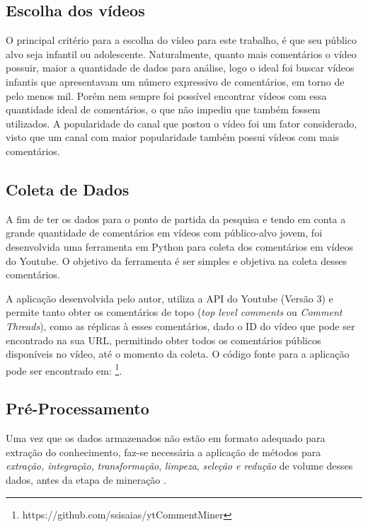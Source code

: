 \subsection{Escolha dos vídeos}
O principal critério para a escolha do vídeo para este trabalho, é que seu público alvo seja infantil ou adolescente. Naturalmente, quanto mais comentários o vídeo possuir, maior a quantidade de dados para análise, logo o ideal foi buscar vídeos infantis que apresentavam um número expressivo de comentários, em torno de pelo menos mil. Porém nem sempre foi possível encontrar vídeos com essa quantidade ideal de comentários, o que não impediu que também fossem utilizados. A popularidade do canal que postou o vídeo foi um fator  considerado, visto que um canal com maior popularidade também  possui vídeos com mais comentários.


\subsection{Coleta de Dados}
A fim de ter os dados para o ponto de partida da pesquisa e tendo em conta a grande quantidade de comentários em vídeos com público-alvo jovem, foi desenvolvida uma ferramenta em Python para coleta dos comentários em vídeos do Youtube. O objetivo da ferramenta é ser simples e objetiva na coleta desses comentários.

A aplicação desenvolvida pelo autor, utiliza a API do Youtube (Versão 3) e permite tanto obter os comentários de topo (\textit{top level comments} ou \textit{Comment Threads}), como as réplicas à esses comentários, dado o ID do vídeo que pode ser encontrado na sua URL, permitindo obter todos os comentários públicos disponíveis no vídeo, até o momento da coleta. O código fonte para a aplicação pode ser encontrado em: \footnote{https://github.com/ssisaias/ytCommentMiner}.


\subsection{Pré-Processamento}
Uma vez que os dados armazenados não estão em formato adequado para extração do conhecimento, faz-se necessária a aplicação de métodos para \textit{extração, integração,} \textit{transformação},
\textit{limpeza}, \textit{seleção e redução} de volume desses dados, antes da etapa de mineração \cite{morais2007mineraccao}.

